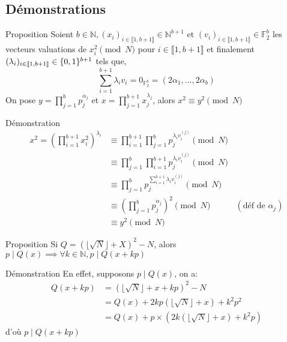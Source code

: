 \addtocounter{framenumber}{-1}
\subsection*{Démonstrations}


\label{demo:congdecarre}
\begin{frame}
    \addtocounter{framenumber}{-1}
    \begin{block}{Proposition}
    Soient $b\in \mathbb N, (x_i)_{i\in \llbracket 1, b+1\rrbracket}\in \mathbb N^{b+1}$
    et $(v_i)_{i\in \llbracket 1, b+1\rrbracket}\in \mathbb F_2^b$ les vecteurs valuations de $x_i^2 \pmod N$ pour $i \in \llbracket 1,b+1 \rrbracket$
    et finalement $(\lambda_i)_{i \in \llbracket 1,b+1 \rrbracket}\in \mathbb \{0,1\}^{b+1}$ tels que,
    \[
    \sum_{i=1}^{b+1} \lambda_iv_i = 0_{\mathbb F_2^b} = (2\alpha_1, \dots, 2\alpha_b)
    \]
    \newline
    On pose $y = \prod_{j=1}^b p_j^{\alpha_j}$ et $x = \prod_{j=1}^{b+1}x_j^{\lambda_j}$, alors $x ^2 \equiv y ^2 \pmod N$
    \end{block}
\end{frame}

\begin{frame}
    \addtocounter{framenumber}{-1}
    \begin{block}{Démonstration}
        \begin{align*}
            x^2 = (\prod_{i=1}^{b+1} x_i^2)^{\lambda_i} &\equiv \prod_{i=1}^{b+1} \prod_{j=1}^b p_j^{\lambda_iv_i^{(j)}} \pmod N\\
            &\equiv \prod_{j=1}^b \prod_{i=1}^{b+1} p_j^{\lambda_iv_i^{(j)}} \pmod N\\
            &\equiv \prod_{j=1}^b p_j^{\sum_{i =1}^{b+1}\lambda_iv_i^{(j)}} \pmod N\\
            &\equiv (\prod_{j=1}^b p_j^{\alpha_j})^2 \pmod N \qquad\quad (\text{déf de } \alpha_j) \\ %
            &\equiv y^2 \pmod N
        \end{align*}
    \end{block}
\end{frame}

\label{demo:qx}
\begin{frame}
    \addtocounter{framenumber}{-1}
    \begin{block}{Proposition}
        Si $Q = (\lfloor\sqrt N\rfloor + X)^2 - N$, alors $p\mid Q(x) \implies \forall k\in \mathbb N,  p\mid Q(x+kp)$
    \end{block}
    \begin{block}{Démonstration}
    En effet, supposons $p\mid Q(x)$, on a:
    \begin{align*}
        Q(x+kp) &= (\lfloor\sqrt N\rfloor + x+kp)^2 - N \\
                &= Q(x) + 2kp(\lfloor\sqrt N\rfloor+ x) + k^2p^2 \\
                &= Q(x) + p\times(2k(\lfloor\sqrt N\rfloor + x) + k^2p)
    \end{align*}
    d'où $p\mid Q(x+kp)$
    \end{block}
\end{frame}

